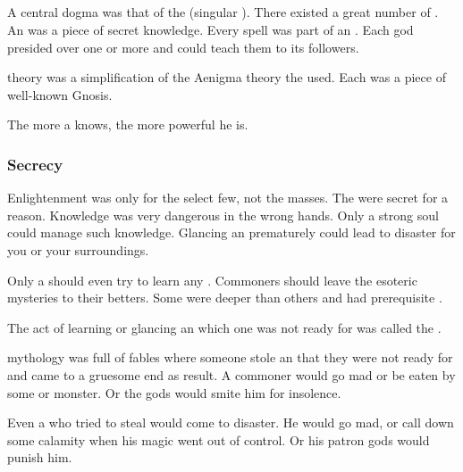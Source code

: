 \subsection{\Arcana}
A central dogma was that of the \arcana (singular \arcanum). 
There existed a great number of \arcana. 
An \arcanum was a piece of secret knowledge. 
Every \rethyax spell was part of an \arcanum.
Each god presided over one or more \arcana and could teach them to its followers. 

\Arcanum theory was a simplification of the Aenigma theory the \dragons used. 
Each \arcanum was a piece of well-known Gnosis.

The more \arcana a \rethyax knows, the more powerful he is. 






\subsubsection{Secrecy}
Enlightenment was only for the select few, not the masses.
The \arcana were secret for a reason.
Knowledge was very dangerous in the wrong hands. 
Only a strong soul could manage such knowledge. 
Glancing an \arcanum prematurely could lead to disaster for you or your surroundings. 

Only a \rethyax should even try to learn any \arcana.
Commoners should leave the esoteric mysteries to their betters.
Some \arcana were deeper than others and had prerequisite \arcana. 

The act of learning or glancing an \arcanum which one was not ready for was called  the \arcanum. 

\Ortaican mythology was full of fables where someone stole an \arcanum that they were not ready for and came to a gruesome end as result. 
A commoner would go mad or be eaten by some \daemon or monster.
Or the gods would smite him for insolence. 

Even a \rethyax who tried to steal \arcana would come to disaster.
He would go mad, or call down some calamity when his magic went out of control.
Or his patron gods would punish him. 





